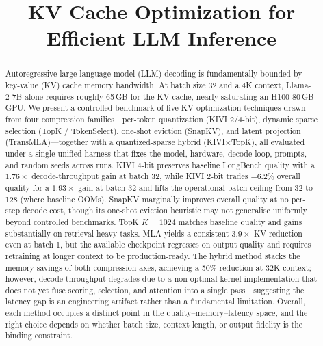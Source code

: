 \documentclass[conference]{IEEEtran}
\begin{document}
\title{KV Cache Optimization for Efficient LLM Inference}

\author{%
}

\maketitle

\begin{abstract}
Autoregressive large-language-model (LLM) decoding is fundamentally
bounded by key-value (KV) cache memory bandwidth.  At batch size 32
and a 4K context, Llama-2-7B alone requires roughly 65\,GB for the KV
cache, nearly saturating an H100 80\,GB GPU.  We present a controlled
benchmark of five KV optimization techniques drawn from four
compression families---per-token quantization (KIVI 2/4-bit), dynamic
sparse selection (TopK / TokenSelect), one-shot eviction (SnapKV), and
latent projection (TransMLA)---together with a quantized-sparse hybrid
(KIVI$\times$TopK), all evaluated under a single unified harness that
fixes the model, hardware, decode loop, prompts, and random seeds
across runs.  KIVI 4-bit preserves baseline LongBench quality with a
$1.76\times$ decode-throughput gain at batch 32, while KIVI 2-bit
trades $-6.2\%$ overall quality for a $1.93\times$ gain at batch 32 and
lifts the operational batch ceiling from 32 to 128 (where baseline
OOMs).  SnapKV marginally improves overall quality at no per-step
decode cost, though its one-shot eviction heuristic may not generalise
uniformly beyond controlled benchmarks.  TopK $K\!=\!1024$ matches
baseline quality and gains substantially on retrieval-heavy tasks.
MLA yields a consistent $3.9\times$ KV reduction even at batch 1, but
the available checkpoint regresses on output quality and requires
retraining at longer context to be production-ready.  The hybrid
method stacks the memory savings of both compression axes, achieving a
50\% reduction at 32K context; however, decode throughput degrades due
to a non-optimal kernel implementation that does not yet fuse scoring,
selection, and attention into a single pass---suggesting the latency
gap is an engineering artifact rather than a fundamental limitation.
Overall, each method occupies a distinct point in the
quality--memory--latency space, and the right choice depends on
whether batch size, context length, or output fidelity is the binding
constraint.
\end{abstract}
\end{document}
